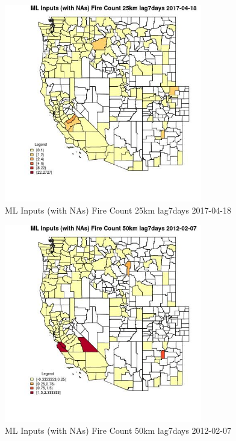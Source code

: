 \begin{figure} 
\centering  
\includegraphics[width=0.77\textwidth]{Code_Outputs/Report_ML_input_PM25_Step4_part_f_de_duplicated_aves_prioritize_24hr_obswNAs_CountyFire_Count_25km_lag7daysMean2017-04-18.jpg} 
\caption{\label{fig:Report_ML_input_PM25_Step4_part_f_de_duplicated_aves_prioritize_24hr_obswNAsCountyFire_Count_25km_lag7daysMean2017-04-18}ML Inputs (with NAs) Fire Count 25km lag7days 2017-04-18} 
\end{figure} 
 

\begin{figure} 
\centering  
\includegraphics[width=0.77\textwidth]{Code_Outputs/Report_ML_input_PM25_Step4_part_f_de_duplicated_aves_prioritize_24hr_obswNAs_CountyFire_Count_50km_lag7daysMean2012-02-07.jpg} 
\caption{\label{fig:Report_ML_input_PM25_Step4_part_f_de_duplicated_aves_prioritize_24hr_obswNAsCountyFire_Count_50km_lag7daysMean2012-02-07}ML Inputs (with NAs) Fire Count 50km lag7days 2012-02-07} 
\end{figure} 
 

